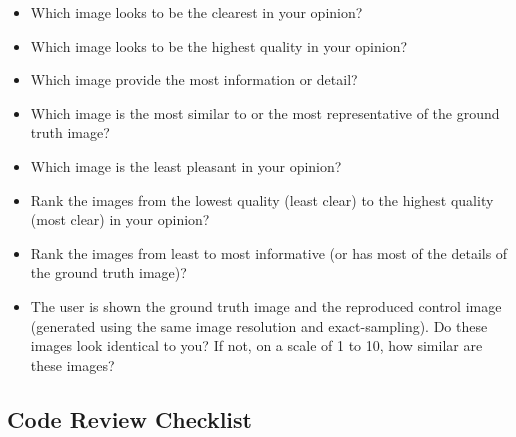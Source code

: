\documentclass[12pt, titlepage]{article}
\begin{document}
\begin{itemize}
  \item{Which image looks to be the clearest in your opinion?}
  \item{Which image looks to be the highest quality in your opinion?}
  \item{Which image provide the most information or detail?}
  \item{Which image is the most similar to or the most representative of the ground truth image?}
  \item{Which image is the least pleasant in your opinion?}
  \item{Rank the images from the lowest quality (least clear) to the highest quality (most clear) in your opinion?}
  \item{Rank the images from least to most informative (or has most of the details of the ground truth image)?}
  \item{The user is shown the ground truth image and the reproduced control image 
  (generated using the same image resolution and exact-sampling). 
  Do these images look identical to you? If not, on a scale of 1 to 10, how similar are these images?}
\end{itemize}

\subsection{Code Review Checklist} \label{checklist_codeReview}
\end{document}
